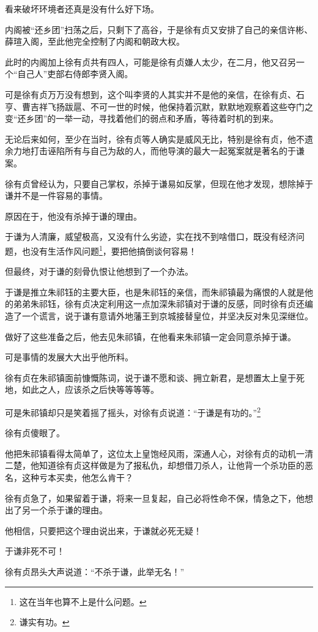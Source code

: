 \begin{multicols}{\theparacolNo}
看来破坏环境者还真是没有什么好下场。

内阁被“还乡团”扫荡之后，只剩下了高谷，于是徐有贞又安排了自己的亲信许彬、薛瑄入阁，至此他完全控制了内阁和朝政大权。

此时的内阁加上徐有贞共有四人，可能是徐有贞嫌人太少，在二月，他又召另一个“自己人”吏部右侍郎李贤入阁。

可是徐有贞万万没有想到，这个叫李贤的人其实并不是他的亲信，在徐有贞、石亨、曹吉祥飞扬跋扈、不可一世的时候，他保持着沉默，默默地观察着这些夺门之变“还乡团”的一举一动，寻找着他们的弱点和矛盾，等待着时机的到来。

无论后来如何，至少在当时，徐有贞等人确实是威风无比，特别是徐有贞，他不遗余力地打击诬陷所有与自己为敌的人，而他导演的最大一起冤案就是著名的于谦案。

徐有贞曾经认为，只要自己掌权，杀掉于谦易如反掌，但现在他才发现，想除掉于谦并不是一件容易的事情。

原因在于，他没有杀掉于谦的理由。

于谦为人清廉，威望极高，又没有什么劣迹，实在找不到啥借口，既没有经济问题，也没有生活作风问题\footnote{这在当年也算不上是什么问题。}，要把他搞倒谈何容易！

但最终，对于谦的刻骨仇恨让他想到了一个办法。

于谦是推立朱祁钰的主要大臣，也是朱祁钰的亲信，而朱祁镇最为痛恨的人就是他的弟弟朱祁钰，徐有贞决定利用这一点加深朱祁镇对于谦的反感，同时徐有贞还编造了一个谎言，说于谦有意请外地藩王到京城接替皇位，并坚决反对朱见深继位。

做好了这些准备之后，他去见朱祁镇，在他看来朱祁镇一定会同意杀掉于谦。

可是事情的发展大大出乎他所料。

徐有贞在朱祁镇面前慷慨陈词，说于谦不愿和谈、拥立新君，是想置太上皇于死地，如此之人，应该杀之后快等等等等。

可是朱祁镇却只是笑着摇了摇头，对徐有贞说道：“于谦是有功的。”\footnote{谦实有功。}

徐有贞傻眼了。

他把朱祁镇看得太简单了，这位太上皇饱经风雨，深通人心，对徐有贞的动机一清二楚，他知道徐有贞这样做是为了报私仇，却想借刀杀人，让他背一个杀功臣的恶名，这种亏本买卖，他怎么肯干？

徐有贞急了，如果留着于谦，将来一旦复起，自己必将性命不保，情急之下，他想出了另一个杀于谦的理由。

他相信，只要把这个理由说出来，于谦就必死无疑！

于谦非死不可！

徐有贞昂头大声说道：“不杀于谦，此举无名！”


\end{multicols}
